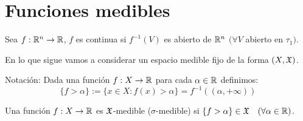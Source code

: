 \section{Funciones medibles}

\begin{prop}
    Sea $f: \mathbb{R}^n \to \mathbb{R}$, $f$ es continua si $f^{-1}(V)$ es abierto de $ \mathbb{R}^n$ $(\forall V$ abierto en $\tau_1)$.
\end{prop}
En lo que sigue vamos a considerar un espacio medible fijo de la forma $(X, \mathfrak{X})$.

Notación: Dada una función $f: X \to \mathbb{R}$ para cada $\alpha \in \mathbb{R}$ definimos: \begin{equation}
    \{ f > \alpha \} := \{ x \in X : f(x) > \alpha \} = f^{-1}((\alpha, +\infty))
\end{equation}

\begin{definition}
    Una función $f: X \to \mathbb{R}$ es $\mathfrak{X}$-medible ($ \sigma $-medible) si $\{ f > \alpha \} \in \mathfrak{X} \quad (\forall \alpha \in \mathbb{R})$.
\end{definition}

\clearpage

